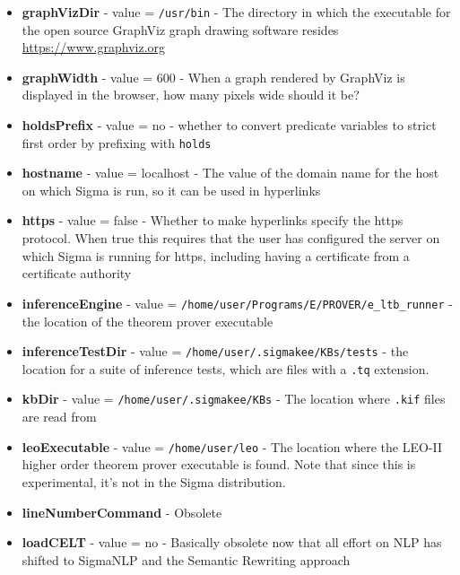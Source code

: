 \documentclass{book}
\begin{document}
\begin{itemize}
  \item \textbf{graphVizDir} - value = \texttt{/usr/bin} - The directory in which the
executable for the open source GraphViz graph drawing software resides 
\url{https://www.graphviz.org}

\item \textbf{graphWidth} - value = 600 - When a graph rendered by GraphViz is
displayed in the browser, how many pixels wide should it be?

\item \textbf{holdsPrefix} - value = no - whether to convert predicate variables
to strict first order by prefixing with \texttt{holds}

\item \textbf{hostname} - value = localhost - The value of the domain name for
the host on which Sigma is run, so it can be used in hyperlinks

\item \textbf{https} - value = false - Whether to make hyperlinks specify the
https protocol.  When true this requires that the user has configured the server
on which Sigma is running for https, including having a certificate from a
certificate authority

\item \textbf{inferenceEngine} - value =
\texttt{/home/user/Programs/E/PROVER/e_ltb_runner} - the location of the theorem
prover executable

\item \textbf{inferenceTestDir} - value =
\texttt{/home/user/.sigmakee/KBs/tests} - the location for a suite of inference
tests, which are files with a \texttt{.tq} extension.

\item \textbf{kbDir} - value = \texttt{/home/user/.sigmakee/KBs} - The location
where \texttt{.kif} files are read from 

\item \textbf{leoExecutable}  - value = \texttt{/home/user/leo} - The location
where the LEO-II higher order theorem prover executable is found.  Note that
since this is experimental, it's not in the Sigma distribution.

\item \textbf{lineNumberCommand} - Obsolete

\item \textbf{loadCELT} - value = no - Basically obsolete now that all effort
on NLP has shifted to SigmaNLP and the Semantic Rewriting approach


\end{itemize}
\end{document}
